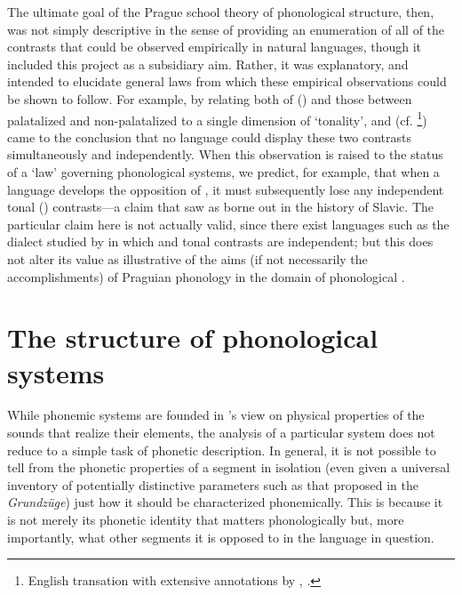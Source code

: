 The ultimate goal of the Prague school theory of phonological
structure, then, was not simply descriptive in the sense of providing
an enumeration of all of the contrasts that could be observed
empirically in natural languages, though it included this project as a
subsidiary aim. Rather, it was explanatory, and intended to elucidate
general laws from which these empirical observations could be shown to
follow. For example, by relating both  of  () and
those between palatalized and non-palatalized  to a single
dimension of `tonality', {\Jakobson} and {\Trubetzkoy}
(cf. \citealt{jakobson29:remarks}\footnote{{English} transation with
  extensive annotations by ,
  \protect\citealt{jakobson18:remarks}.}) came to the conclusion that
no language could display these two contrasts simultaneously and
independently. When this observation is raised to the status of a
`law' governing phonological systems, we predict, for example, that
when a language develops the opposition of , it must
subsequently lose any independent tonal () contrasts---a claim
that \citet{jakobson29:remarks} saw as borne out in the history of
Slavic. The particular claim here is not actually valid, since there
exist languages such as the  dialect studied by
\citet{scott56:szechuanese} in which  and tonal
contrasts are independent; but this does not alter its value as
illustrative of the aims (if not necessarily the accomplishments) of
Praguian phonology in the domain of phonological .

\section{The structure of phonological systems}
\label{sec:structure-of-systems}

While phonemic systems are founded in {\Trubetzkoy}'s view on physical
properties of the sounds that realize their elements, the analysis of
a particular system does not reduce to a simple task of phonetic
description. In general, it is not possible to tell from the phonetic
properties of a segment in isolation (even given a universal inventory
of potentially distinctive parameters such as that proposed in the
\textsl{Grundzüge}) just how it should be characterized phonemically. This is
because it is not merely its phonetic identity that matters
phonologically but, more importantly, what other segments it is
opposed to in the language in question. 


